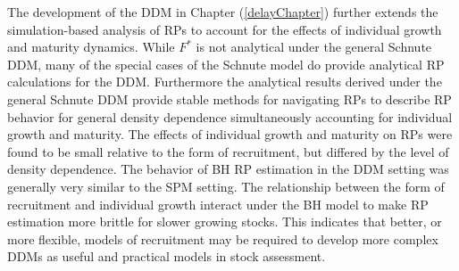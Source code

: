 \documentclass[12pt]{ucscthesis}
\begin{document}

%
The development of the DDM in Chapter (\ref{delayChapter}) further 
extends the simulation-based analysis of RPs to account for the effects of 
individual growth and maturity dynamics. While $F^*$ is not analytical 
under the general Schnute DDM, many of the special cases of the Schnute model 
do provide analytical RP calculations for the DDM.
Furthermore the analytical results derived under the general Schnute DDM 
provide stable methods for navigating RPs to describe RP behavior for 
general density dependence simultaneously accounting for individual growth 
and maturity. %
The effects of individual growth and maturity on RPs were found to be small 
relative to the form of recruitment, but differed by the level of density 
dependence. The behavior of BH RP estimation in the DDM setting was generally 
very similar to the SPM setting. The relationship between the form of recruitment 
and individual growth interact under the BH model to make RP estimation more 
brittle for slower growing stocks. This indicates that better, or more flexible, 
models of recruitment may be required to develop more complex DDMs as useful 
and practical models in stock assessment. 

\end{document}

